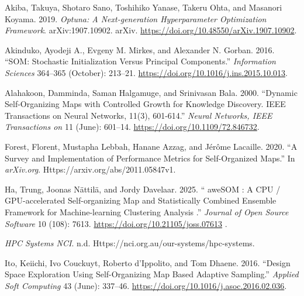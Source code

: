 \documentclass[
]{article}
\newlength{\cslhangindent}
\newenvironment{CSLReferences}[2] %
 {\begin{list}{}{%
  \setlength{\itemindent}{0pt}
  \setlength{\leftmargin}{0pt}
  \setlength{\parsep}{0pt}
  \ifodd #1
   \setlength{\leftmargin}{\cslhangindent}
   \setlength{\itemindent}{-1\cslhangindent}
  \fi
  \setlength{\itemsep}{#2\baselineskip}}}
 {\end{list}}
\providecommand{\DIFadd}[1]{{\protect\color{blue} #1}} %
\providecommand{\DIFaddbegin}{} %
\providecommand{\DIFaddend}{} %
\begin{document}
\protect{}\label{refs}
\begin{CSLReferences}{1}{1}
Akiba, Takuya, Shotaro Sano, Toshihiko Yanase, Takeru Ohta, and Masanori
Koyama. 2019. \emph{Optuna: {A Next-generation Hyperparameter
Optimization Framework}}. arXiv:1907.10902. arXiv.
\url{https://doi.org/10.48550/arXiv.1907.10902}.

Akinduko, Ayodeji A., Evgeny M. Mirkes, and Alexander N. Gorban. 2016.
{``{SOM}: {Stochastic} Initialization Versus Principal Components.''}
\emph{Information Sciences} 364--365 (October): 213--21.
\url{https://doi.org/10.1016/j.ins.2015.10.013}.

Alahakoon, Damminda, Saman Halgamuge, and Srinivasan Bala. 2000.
{``Dynamic Self-Organizing Maps with Controlled Growth for Knowledge
Discovery. {IEEE Transactions} on {Neural Networks}, 11(3), 601-614.''}
\emph{Neural Networks, IEEE Transactions on} 11 (June): 601--14.
\url{https://doi.org/10.1109/72.846732}.

Forest, Florent, Mustapha Lebbah, Hanane Azzag, and Jérôme Lacaille.
2020. {``A {Survey} and {Implementation} of {Performance Metrics} for
{Self-Organized Maps}.''} In \emph{arXiv.org}.
Https://arxiv.org/abs/2011.05847v1.

\DIFaddbegin {}
\DIFadd{Ha, Trung, Joonas Nättilä, and Jordy Davelaar. 2025. }{\DIFadd{``}{\DIFadd{aweSOM}}\DIFadd{: A
}{\DIFadd{CPU}}\DIFadd{/}{\DIFadd{GPU-accelerated Self-organizing Map}} \DIFadd{and }{\DIFadd{Statistically Combined
Ensemble Framework}} \DIFadd{for }{\DIFadd{Machine-learning Clustering Analysis}}\DIFadd{.''}}
\DIFadd{\emph{Journal of Open Source Software} 10 (108): 7613.
}\url{https://doi.org/10.21105/joss.07613}\DIFadd{.
}

\DIFaddend {}
\emph{{HPC Systems} \textbar{} {NCI}}. n.d.
Https://nci.org.au/our-systems/hpc-systems.

{Ito, Keiichi, Ivo Couckuyt, Roberto d'Ippolito, and Tom Dhaene}. 2016.
{``Design Space Exploration Using {Self-Organizing Map} Based Adaptive
Sampling.''} \emph{Applied Soft Computing} 43 (June): 337--46.
\url{https://doi.org/10.1016/j.asoc.2016.02.036}.


\end{CSLReferences}
\end{document}
